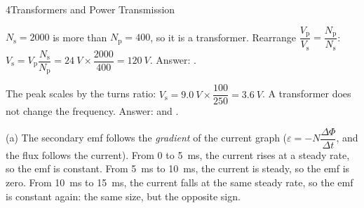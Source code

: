 \begin{chapteranswers}{4}{Transformers and Power Transmission}
  \item $N_\mathrm{s} = 2000$ is more than $N_\mathrm{p} = 400$, so it is a
         transformer. Rearrange
        $\dfrac{V_\mathrm{p}}{V_\mathrm{s}} = \dfrac{N_\mathrm{p}}{N_\mathrm{s}}$:
        $V_\mathrm{s} = V_\mathrm{p}\dfrac{N_\mathrm{s}}{N_\mathrm{p}}
        = \qty{24}{V} \times \dfrac{2000}{400} = \qty{120}{V}$.
        Answer: .
  \item The peak scales by the turns ratio:
        $V_\mathrm{s} = \qty{9.0}{V} \times \dfrac{100}{250} = \qty{3.6}{V}$.
        A transformer does not change the frequency.
        Answer:  and .
  \item (a) The secondary emf follows the \emph{gradient} of the current graph
        ($\varepsilon = -N\dfrac{\Delta\Phi}{\Delta t}$, and the flux follows the current).
        From 0 to \qty{5}{ms}, the current rises at a steady rate, so the emf is
        constant. From \qty{5}{ms} to \qty{10}{ms}, the current is steady, so the emf is
        zero. From \qty{10}{ms} to \qty{15}{ms}, the current falls at the same steady
        rate, so the emf is constant again: the same size, but the opposite sign.
        \par{}
\end{chapteranswers}

